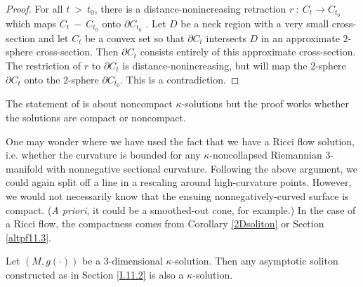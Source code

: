 \begin{proof}
For all $t \: > \: t_0$, there is a distance-nonincreasing retraction
$r \: : \: C_t \rightarrow C_{t_0}$ which maps $C_t \: - \: C_{t_0}$ onto
$\partial C_{t_0}$ \cite{Sharafutdinov}. Let $D$ be a neck region
with a very small cross-section and let $C_t$ be a convex set so that
$\partial C_t$ intersects $D$ in an approximate $2$-sphere cross-section.
Then $\partial C_t$ consists entirely of this approximate cross-section.
The restriction of $r$ to $\partial C_t$ is distance-nonincreasing, but
will map the $2$-sphere $\partial C_t$ onto
the $2$-sphere $\partial C_{t_0}$. This is a contradiction.
\end{proof}

\begin{remark}
  \label{rem:kl-compactness-space-three-dimensional-solutions-compactness-kappa-solutions}
 The statement of \cite[Theorem 11.7]{Perelman} is about
noncompact $\kappa$-solutions but the proof works whether the
solutions are compact or noncompact.
\end{remark}


\begin{remark}
  \label{rem:kl-compactness-space-three-dimensional-solutions-compactness-kappa-solutions-3}

 One may wonder where we have used the fact that we have a
Ricci flow solution, i.e. whether the curvature is bounded for
any $\kappa$-noncollapsed Riemannian $3$-manifold with nonnegative
sectional curvature.  Following the above argument, we could again split off
a line in a rescaling around high-curvature points.  However, we would
not necessarily know that the ensuing nonnegatively-curved
surface is compact. ({\it A priori}, it could be a smoothed-out cone, for
example.)  In the case of a Ricci flow, the compactness comes from
Corollary \ref{2Dsoliton} or Section \ref{altpf11.3}.
\end{remark}



\begin{corollary}
  \label{cor:kl-compactness-space-three-dimensional-solutions-kappa-solutions-corollary}

Let $(M,g(\cdot))$ be a $3$-dimensional $\kappa$-solution.
Then any asymptotic soliton constructed as in Section \ref{I.11.2} is
also a $\kappa$-solution.
\end{corollary}


